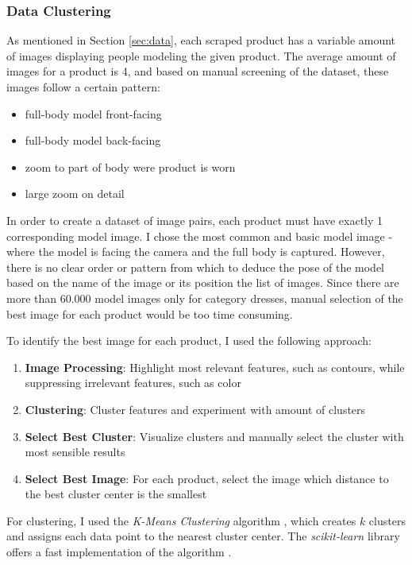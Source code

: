 \documentclass{article}
\begin{document}
\subsubsection{Data Clustering}
As mentioned in Section \ref{sec:data}, each scraped product has a variable amount of images displaying people modeling the given product. The average amount of images for a product is 4, and based on manual screening of the dataset, these images follow a certain pattern:
\begin{itemize}
\item full-body model front-facing
\item full-body model back-facing
\item zoom to part of body were product is worn
\item large zoom on detail
\end{itemize}

In order to create a dataset of image pairs, each product must have exactly 1 corresponding model image. I chose the most common and basic model image - where the model is facing the camera and the full body is captured. However, there is no clear order or pattern from which to deduce the pose of the model based on the name of the image or its position the list of images. Since there are more than 60.000 model images only for category dresses, manual selection of the best image for each product would be too time consuming.

To identify the best image for each product, I used the following approach:
\begin{enumerate}
	\item \textbf{Image Processing}: Highlight most relevant features, such as contours, while suppressing irrelevant features, such as color
	\item \textbf{Clustering}: Cluster features and experiment with amount of clusters
	\item \textbf{Select Best Cluster}: Visualize clusters and manually select the cluster with most sensible results
	\item \textbf{Select Best Image}: For each product, select the image which distance to the best cluster center is the smallest
\end{enumerate}


For clustering, I used the \textit{K-Means Clustering} algorithm \cite{noauthor_k-means_2018}, which creates $k$ clusters and assigns each data point to the nearest cluster center. The \textit{scikit-learn} library offers a fast implementation of the algorithm \cite{noauthor_sklearn.cluster.kmeans_nodate}.
\end{document}
